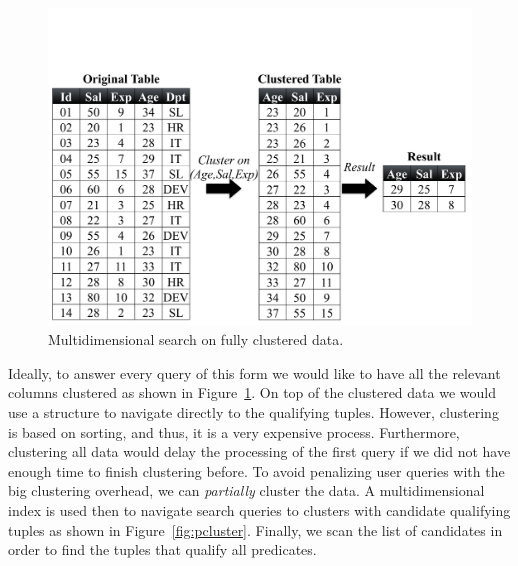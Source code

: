 \begin{figure}[t]
\begin{center}
\vspace*{3\baselineskip}
\includegraphics[trim=0cm 2cm 0cm 9.5cm, width=\columnwidth]{Figures/example_relation}
\caption{Multidimensional search on fully clustered data.}
\label{fig:fcluster}
\end{center}
\end{figure}

Ideally, to answer every query of this form we would like to have all the
relevant columns clustered as shown in Figure~\ref{fig:fcluster}.
On top of the clustered data we would use a structure to navigate directly
to the qualifying tuples. However, clustering is based on sorting, and thus,
it is a very expensive process.
Furthermore, clustering all data would delay the processing of the first query
if we did not have 
enough time to finish clustering before. To avoid penalizing user queries
with the big clustering overhead, we can \emph{partially} cluster the data.
A multidimensional index is used then to navigate search queries to clusters
with candidate qualifying tuples as shown in Figure~\ref{fig:pcluster}.
Finally, we scan the list of candidates
in order to find the tuples that qualify all predicates. 

